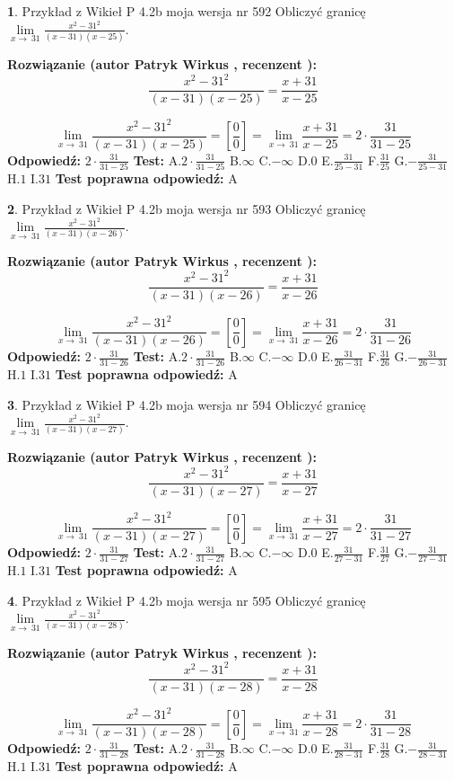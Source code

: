 \documentclass[12pt, a4paper]{article}
\theoremstyle{definition} %
\newtheorem{zad}{}
\newcommand{\zadStart}[1]{\begin{zad}#1\newline}
\newcommand{\zadStop}{\end{zad}}
\newcommand{\rozwStart}[2]{\noindent \textbf{Rozwiązanie (autor #1 , recenzent #2): }\newline}
\newcommand{\rozwStop}{\newline}
\newcommand{\odpStart}{\noindent \textbf{Odpowiedź:}\newline}
\newcommand{\odpStop}{\newline}
\newcommand{\testStart}{\noindent \textbf{Test:}\newline}
\newcommand{\testStop}{\newline}
\newcommand{\kluczStart}{\noindent \textbf{Test poprawna odpowiedź:}\newline}
\newcommand{\kluczStop}{\newline}
\begin{document}
\zadStart{Przykład z Wikieł P 4.2b moja wersja nr 592}
Obliczyć granicę $\lim\limits_{x\to\ 31}\frac{x^{2}-31^{2}}{(x-31)(x-25)}$.
\zadStop
\rozwStart{Patryk Wirkus}{}
$$\frac{x^{2}-31^{2}}{(x-31)(x-25)}=\frac{x+31}{x-25}$$

$$\lim\limits_{x\to\ 31}\frac{x^{2}-31^{2}}{(x-31)(x-25)}=[\frac{0}{0}]=\lim\limits_{x\to\ 31}\frac{x+31}{x-25}=2 \cdot \frac{31}{31-25}$$
\rozwStop
\odpStart
$2 \cdot \frac{31}{31-25}$
\odpStop
\testStart
A.$2 \cdot \frac{31}{31-25}$
B.$\infty$
C.$-\infty$
D.$0$
E.$\frac{31}{25-31}$
F.$\frac{31}{25}$
G.$-\frac{31}{25-31}$
H.$1$
I.$31$
\testStop
\kluczStart
A
\kluczStop



\zadStart{Przykład z Wikieł P 4.2b moja wersja nr 593}
Obliczyć granicę $\lim\limits_{x\to\ 31}\frac{x^{2}-31^{2}}{(x-31)(x-26)}$.
\zadStop
\rozwStart{Patryk Wirkus}{}
$$\frac{x^{2}-31^{2}}{(x-31)(x-26)}=\frac{x+31}{x-26}$$

$$\lim\limits_{x\to\ 31}\frac{x^{2}-31^{2}}{(x-31)(x-26)}=[\frac{0}{0}]=\lim\limits_{x\to\ 31}\frac{x+31}{x-26}=2 \cdot \frac{31}{31-26}$$
\rozwStop
\odpStart
$2 \cdot \frac{31}{31-26}$
\odpStop
\testStart
A.$2 \cdot \frac{31}{31-26}$
B.$\infty$
C.$-\infty$
D.$0$
E.$\frac{31}{26-31}$
F.$\frac{31}{26}$
G.$-\frac{31}{26-31}$
H.$1$
I.$31$
\testStop
\kluczStart
A
\kluczStop



\zadStart{Przykład z Wikieł P 4.2b moja wersja nr 594}
Obliczyć granicę $\lim\limits_{x\to\ 31}\frac{x^{2}-31^{2}}{(x-31)(x-27)}$.
\zadStop
\rozwStart{Patryk Wirkus}{}
$$\frac{x^{2}-31^{2}}{(x-31)(x-27)}=\frac{x+31}{x-27}$$

$$\lim\limits_{x\to\ 31}\frac{x^{2}-31^{2}}{(x-31)(x-27)}=[\frac{0}{0}]=\lim\limits_{x\to\ 31}\frac{x+31}{x-27}=2 \cdot \frac{31}{31-27}$$
\rozwStop
\odpStart
$2 \cdot \frac{31}{31-27}$
\odpStop
\testStart
A.$2 \cdot \frac{31}{31-27}$
B.$\infty$
C.$-\infty$
D.$0$
E.$\frac{31}{27-31}$
F.$\frac{31}{27}$
G.$-\frac{31}{27-31}$
H.$1$
I.$31$
\testStop
\kluczStart
A
\kluczStop



\zadStart{Przykład z Wikieł P 4.2b moja wersja nr 595}
Obliczyć granicę $\lim\limits_{x\to\ 31}\frac{x^{2}-31^{2}}{(x-31)(x-28)}$.
\zadStop
\rozwStart{Patryk Wirkus}{}
$$\frac{x^{2}-31^{2}}{(x-31)(x-28)}=\frac{x+31}{x-28}$$

$$\lim\limits_{x\to\ 31}\frac{x^{2}-31^{2}}{(x-31)(x-28)}=[\frac{0}{0}]=\lim\limits_{x\to\ 31}\frac{x+31}{x-28}=2 \cdot \frac{31}{31-28}$$
\rozwStop
\odpStart
$2 \cdot \frac{31}{31-28}$
\odpStop
\testStart
A.$2 \cdot \frac{31}{31-28}$
B.$\infty$
C.$-\infty$
D.$0$
E.$\frac{31}{28-31}$
F.$\frac{31}{28}$
G.$-\frac{31}{28-31}$
H.$1$
I.$31$
\testStop
\kluczStart
A
\kluczStop
\end{document}
